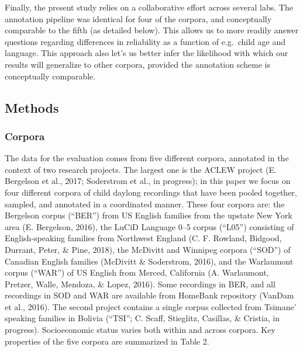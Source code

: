 \documentclass[english,floatsintext,man]{apa6}
\begin{document}
Finally, the present study relies on a collaborative effort across
several labs. The annotation pipeline was identical for four of the
corpora, and conceptually comparable to the fifth (as detailed below).
This allows us to more readily answer questions regarding differences in
reliability as a function of e.g.~child age and language. This approach
also let's us better infer the likelihood with which our results will
generalize to other corpora, provided the annotation scheme is
conceptually comparable.

\subsection{Methods}\label{methods}

\subsubsection{Corpora}\label{corpora}

The data for the evaluation comes from five different corpora, annotated
in the context of two research projects. The largest one is the ACLEW
project (E. Bergelson et al., 2017; Soderstrom et al., in progress); in
this paper we focus on four different corpora of child daylong
recordings that have been pooled together, sampled, and annotated in a
coordinated manner. These four corpora are: the Bergelson corpus
(\enquote{BER}) from US English families from the upstate New York area
(E. Bergelson, 2016), the LuCiD Language 0--5 corpus (\enquote{L05})
consisting of English-speaking families from Northwest England (C. F.
Rowland, Bidgood, Durrant, Peter, \& Pine, 2018), the McDivitt and
Winnipeg corpora (\enquote{SOD}) of Canadian English families (McDivitt
\& Soderstrom, 2016), and the Warlaumont corpus (\enquote{WAR}) of US
English from Merced, California (A. Warlaumont, Pretzer, Walle, Mendoza,
\& Lopez, 2016). Some recordings in BER, and all recordings in SOD and
WAR are available from HomeBank repository (VanDam et al., 2016). The
second project contains a single corpus collected from Tsimane' speaking
families in Bolivia (``TSI''; C. Scaff, Stieglitz, Casillas, \& Cristia,
in progress). Socioeconomic status varies both within and across
corpora. Key properties of the five corpora are summarized in Table 2.
\end{document}
